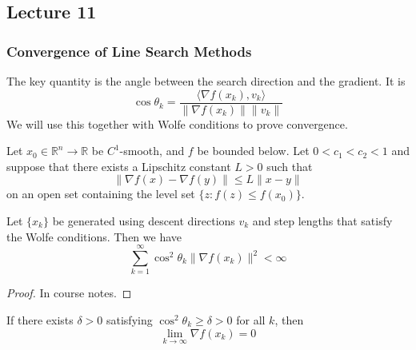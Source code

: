 \subsection{Lecture 11}
\subsubsection{Convergence of Line Search Methods}
\begin{definition}
    The key quantity is the angle between the search direction and the gradient. It is
    $$\cos \theta_k = \frac{\langle \nabla f(x_k), v_k \rangle}{\| \nabla f(x_k) \| \| v_k \|}$$
    We will use this together with Wolfe conditions to prove convergence.
\end{definition}
\begin{theorem}
    Let $x_0 \in \mathbb R^n \to \mathbb R$ be $C^1$-smooth, and $f$ be bounded below. Let $0 < c_1 < c_2 < 1$ and suppose that there exists a Lipschitz constant $L > 0$ such that $$ \| \nabla f(x) - \nabla f(y) \| \leq L \| x - y \|$$
    on an open set containing the level set $\{z: f(z) \leq f(x_0)\}$.

    Let $\{x_k\}$ be generated using descent directions $v_k$ and step lengths that satisfy the Wolfe conditions. Then we have
    $$\sum^\infty_{k=1} \cos^2 \theta_k \|\nabla f(x_k) \|^2 < \infty$$
\end{theorem}
\begin{proof}[Proof]
    In course notes.
\end{proof}
\begin{corollary}
    If there exists $\delta > 0$ satisfying $\cos^2 \theta_k \geq \delta > 0$ for all $k$, then 
    $$\lim_{k \to \infty} \nabla f(x_k) = 0$$
\end{corollary}

